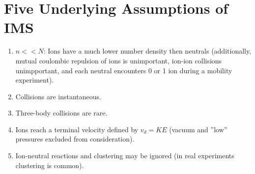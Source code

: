 \documentclass[10pt,a4paper,final]{article}
\begin{document}
\section{Five Underlying Assumptions of IMS}
\begin{enumerate}
	\item $n << N$: Ions have a much lower number density then neutrals (additionally, mutual coulombic repulsion of ions is unimportant, ion-ion collisions unimpportant, and each neutral encounters 0 or 1 ion during a mobility experiment).
	\item Collisions are instantaneous.
	\item Three-body collisions are rare.
	\item Ions reach a terminal velocity defined by $v_d=KE$ (vacuum and  ''low'' pressures excluded from consideration).
	\item Ion-neutral reactions and clustering may be ignored (in real experiments clustering is common).	
\end{enumerate}

	
\end{document}
